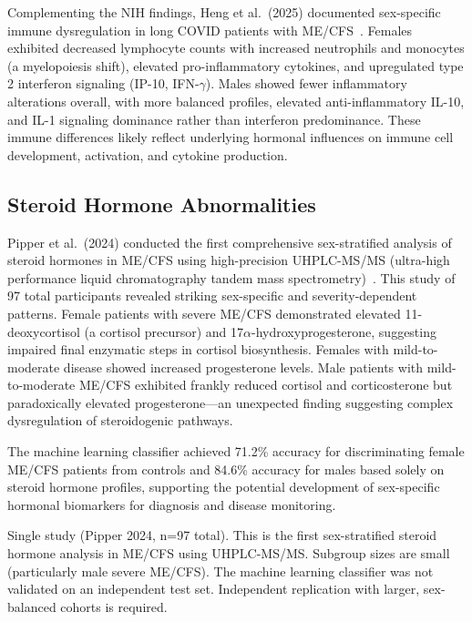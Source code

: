 Complementing the NIH findings, Heng et al.\ (2025) documented sex-specific immune dysregulation in long COVID patients with ME/CFS~\cite{heng2025sexspecific}. Females exhibited decreased lymphocyte counts with increased neutrophils and monocytes (a myelopoiesis shift), elevated pro-inflammatory cytokines, and upregulated type 2 interferon signaling (IP-10, IFN-$\gamma$). Males showed fewer inflammatory alterations overall, with more balanced profiles, elevated anti-inflammatory IL-10, and IL-1 signaling dominance rather than interferon predominance. These immune differences likely reflect underlying hormonal influences on immune cell development, activation, and cytokine production.

\subsection{Steroid Hormone Abnormalities}

\begin{achievement}
\label{ach:steroid-profiles}
Pipper et al.\ (2024) conducted the first comprehensive sex-stratified analysis of steroid hormones in ME/CFS using high-precision UHPLC-MS/MS (ultra-high performance liquid chromatography tandem mass spectrometry)~\cite{pipper2024steroid}. This study of 97 total participants revealed striking sex-specific and severity-dependent patterns. Female patients with severe ME/CFS demonstrated elevated 11-deoxycortisol (a cortisol precursor) and 17$\alpha$-hydroxyprogesterone, suggesting impaired final enzymatic steps in cortisol biosynthesis. Females with mild-to-moderate disease showed increased progesterone levels. Male patients with mild-to-moderate ME/CFS exhibited frankly reduced cortisol and corticosterone but paradoxically elevated progesterone---an unexpected finding suggesting complex dysregulation of steroidogenic pathways.

The machine learning classifier achieved 71.2\% accuracy for discriminating female ME/CFS patients from controls and 84.6\% accuracy for males based solely on steroid hormone profiles, supporting the potential development of sex-specific hormonal biomarkers for diagnosis and disease monitoring.
\end{achievement}

\begin{warning}
Single study (Pipper 2024, n=97 total). This is the first sex-stratified steroid hormone analysis in ME/CFS using UHPLC-MS/MS. Subgroup sizes are small (particularly male severe ME/CFS). The machine learning classifier was not validated on an independent test set. Independent replication with larger, sex-balanced cohorts is required.
\end{warning}

